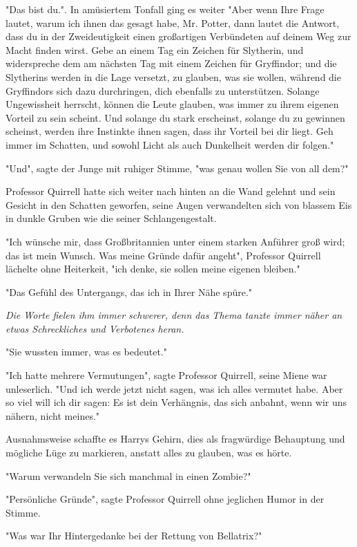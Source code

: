 {"Das bist du.". In amüsiertem Tonfall ging es weiter "Aber wenn Ihre Frage lautet, warum ich ihnen das gesagt habe, Mr. Potter, dann lautet die Antwort, dass du in der Zweideutigkeit einen großartigen Verbündeten auf deinem Weg zur Macht finden wirst. Gebe an einem Tag ein Zeichen für Slytherin, und widerspreche dem am nächsten Tag mit einem Zeichen für Gryffindor; und die Slytherins werden in die Lage versetzt, zu glauben, was sie wollen, während die Gryffindors sich dazu durchringen, dich ebenfalls zu unterstützen. Solange Ungewissheit herrscht, können die Leute glauben, was immer zu ihrem eigenen Vorteil zu sein scheint. Und solange du stark erscheinst, solange du zu gewinnen scheinst, werden ihre Instinkte ihnen sagen, dass ihr Vorteil bei dir liegt. Geh immer im Schatten, und sowohl Licht als auch Dunkelheit werden dir folgen."

"Und", sagte der Junge mit ruhiger Stimme, "was genau wollen Sie von all dem?"

Professor Quirrell hatte sich weiter nach hinten an die Wand gelehnt und sein Gesicht in den Schatten geworfen, seine Augen verwandelten sich von blassem Eis in dunkle Gruben wie die seiner Schlangengestalt.

"Ich wünsche mir, dass Großbritannien unter einem starken Anführer groß wird; das ist mein Wunsch. Was meine Gründe dafür angeht", Professor Quirrell lächelte ohne Heiterkeit, "ich denke, sie sollen meine eigenen bleiben."

"Das Gefühl des Untergangs, das ich in Ihrer Nähe spüre."

\emph{Die Worte fielen ihm immer schwerer, denn das Thema tanzte immer näher an etwas Schreckliches und Verbotenes heran.}

"Sie wussten immer, was es bedeutet."

"Ich hatte mehrere Vermutungen", sagte Professor Quirrell, seine Miene war unleserlich. "Und ich werde jetzt nicht sagen, was ich alles vermutet habe. Aber so viel will ich dir sagen: Es ist dein Verhängnis, das sich anbahnt, wenn wir uns nähern, nicht meines."

Ausnahmsweise schaffte es Harrys Gehirn, dies als fragwürdige Behauptung und mögliche Lüge zu markieren, anstatt alles zu glauben, was es hörte.

"Warum verwandeln Sie sich manchmal in einen Zombie?"

"Persönliche Gründe", sagte Professor Quirrell ohne jeglichen Humor in der Stimme.

"Was war Ihr Hintergedanke bei der Rettung von Bellatrix?"

}
